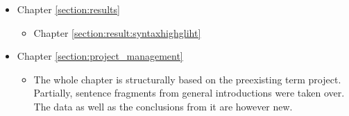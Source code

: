 \begin{itemize}
    \item Chapter \ref{section:results} 
        \begin{itemize}
            \item Chapter \ref{section:result:syntaxhighgliht}
        \end{itemize}

    \item Chapter \ref{section:project_management} 
        \begin{itemize}
            \item The whole chapter is structurally based on the preexisting term project.
            Partially, sentence fragments from general introductions were taken over.
            The data as well as the conclusions from it are however new.
        \end{itemize}


\end{itemize}
